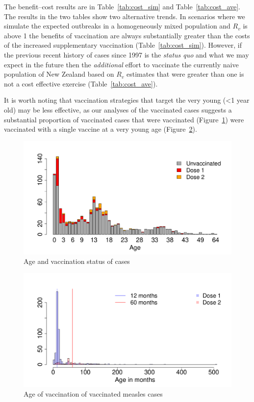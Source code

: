 \documentclass{article}
\begin{document}
The benefit--cost results are in Table~\ref{tab:cost_sim} and Table~\ref{tab:cost_ave}. The results in the two tables show two alternative trends. In scenarios where we simulate the expected outbreaks in a homogeneously mixed population and $R_v$ is above 1 the benefits of vaccination are always substantially greater than the costs of the increased supplementary vaccination (Table~\ref{tab:cost_sim}). However, if the previous recent history of cases since 1997 is the \emph{status quo} and what we may expect in the future then the \emph{additional} effort to vaccinate the currently naive population of New Zealand based on $R_v$ estimates that were greater than one is not a cost effective exercise (Table~\ref{tab:cost_ave}).

It is worth noting that vaccination strategies that target the very young (<1 year old) may be less effective, as our analyses of the vaccinated cases suggests a substantial proportion of vaccinated cases that were vaccinated (Figure~\ref{fig:ageandvac}) were vaccinated with a single vaccine at a very young age (Figure~\ref{fig:vaccstat}).

\begin{figure}[h!]
\begin{center}
\includegraphics{draftfinalreport-061}
\end{center}
\caption{Age and vaccination status of cases}
\label{fig:ageandvac}
\end{figure}

\begin{figure}[h!]
\begin{center}
\includegraphics{draftfinalreport-062}
\end{center}
\caption{Age of vaccination of vaccinated measles cases}
\label{fig:vaccstat}
\end{figure}
\end{document}
